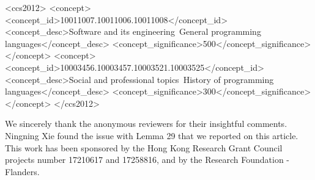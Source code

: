 \documentclass[acmsmall,review]{acmart}\settopmatter{printfolios=true}
\begin{document}
\begin{CCSXML}
<ccs2012>
<concept>
<concept_id>10011007.10011006.10011008</concept_id>
<concept_desc>Software and its engineering~General programming languages</concept_desc>
<concept_significance>500</concept_significance>
</concept>
<concept>
<concept_id>10003456.10003457.10003521.10003525</concept_id>
<concept_desc>Social and professional topics~History of programming languages</concept_desc>
<concept_significance>300</concept_significance>
</concept>
</ccs2012>
\end{CCSXML}





\maketitle



%







\begin{acks}                            %

We sincerely thank the anonymous reviewers for their insightful
comments. Ningning Xie found the issue with Lemma 29 that we reported 
on this article. This work has been sponsored by the Hong Kong Research
Grant Council projects number 17210617 and 17258816, and by the
Research Foundation - Flanders.
\end{acks}





\newpage
\appendix

\end{document}
